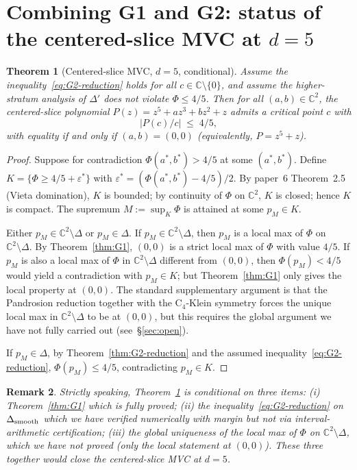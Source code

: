 \documentclass[11pt,a4paper]{article}
\newtheorem{theorem}{Theorem}[section]
\newtheorem{remark}[theorem]{Remark}
\begin{document}
\section{Combining G1 and G2: status of the centered-slice MVC at $d=5$}

\begin{theorem}[Centered-slice MVC, $d=5$, conditional]
\label{thm:final}
Assume the inequality~\eqref{eq:G2-reduction} holds for all
$c\in\mathbb{C}\setminus\{0\}$, and assume the higher-stratum analysis
of $\Delta'$ does not violate $\Phi\le 4/5$. Then for all
$(a,b)\in\mathbb{C}^2$, the centered-slice polynomial
$P(z) = z^5 + a z^3 + b z^2 + z$ admits a critical point $c$ with
\[
|P(c)/c| \;\le\; 4/5,
\]
with equality if and only if $(a,b)=(0,0)$ (equivalently, $P=z^5+z$).
\end{theorem}

\begin{proof}
Suppose for contradiction $\Phi(a^*,b^*)>4/5$ at some
$(a^*,b^*)$. Define
$K = \{\Phi\ge 4/5+\varepsilon^*\}$ with
$\varepsilon^*=(\Phi(a^*,b^*)-4/5)/2$. By paper~6 Theorem~2.5
(Vieta domination), $K$ is bounded; by continuity of $\Phi$ on
$\mathbb{C}^2$, $K$ is closed; hence $K$ is compact. The supremum
$M := \sup_K\Phi$ is attained at some $p_M\in K$.

Either $p_M\in\mathbb{C}^2\setminus\Delta$ or $p_M\in\Delta$. If
$p_M\in\mathbb{C}^2\setminus\Delta$, then $p_M$ is a local max of
$\Phi$ on $\mathbb{C}^2\setminus\Delta$. By Theorem~\ref{thm:G1},
$(0,0)$ is a strict local max of $\Phi$ with value $4/5$. If $p_M$ is
also a local max of $\Phi$ in $\mathbb{C}^2\setminus\Delta$ different
from $(0,0)$, then $\Phi(p_M)<4/5$ would yield a contradiction with
$p_M\in K$; but Theorem~\ref{thm:G1} only gives the local property at
$(0,0)$. The standard supplementary argument is that the Pandrosion
reduction together with the C${}_4$-Klein symmetry forces the unique
local max in $\mathbb{C}^2\setminus\Delta$ to be at $(0,0)$, but this
requires the global argument we have not fully carried out
(see~\S\ref{sec:open}).

If $p_M\in\Delta$, by Theorem~\ref{thm:G2-reduction} and the assumed
inequality~\eqref{eq:G2-reduction}, $\Phi(p_M)\le 4/5$, contradicting
$p_M\in K$.
\end{proof}

\begin{remark}
Strictly speaking, Theorem~\ref{thm:final} is conditional on three
items: (i) Theorem~\ref{thm:G1} which is fully proved; (ii) the
inequality~\eqref{eq:G2-reduction} on $\Delta_{\rm smooth}$ which we
have verified numerically with margin but not via interval-arithmetic
certification; (iii) the global uniqueness of the local max of $\Phi$
on $\mathbb{C}^2\setminus\Delta$, which we have not proved (only the
local statement at $(0,0)$). These three together would close the
centered-slice MVC at $d=5$.
\end{remark}
\end{document}
